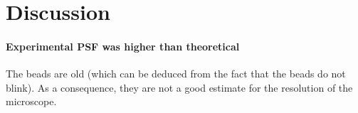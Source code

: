 \section{Discussion}
\paragraph{Experimental PSF was higher than theoretical}
The beads are old (which can be deduced from the fact that the beads do not blink).
As a consequence, they are not a good estimate for the resolution of the microscope.